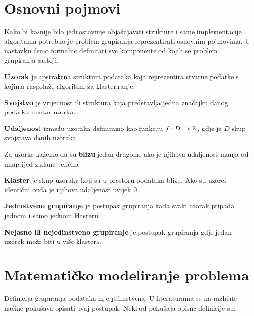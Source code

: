 \documentclass[a4paper,twoside,12pt]{memoir} %
\begin{document}
\section[Osnovni pojmovi][os-pojmovi]{Osnovni pojmovi}
Kako bi kasnije bilo jednostavnije objašnjavati strukture i same implementacije algoritama potrebno je problem grupiranja reprezentirati osnovnim pojmovima. U nastavku ćemo formalno definirati sve komponente od kojih se problem grupiranja sastoji.
\begin{defn}
\label{def:uzorak}
\textbf{Uzorak} je apstraktna struktura podataka koja reprezentira stvarne podatke s kojima raspolaže algoritam za klasteriranje.
\end{defn}
\begin{defn}
\label{def:svojstvo}
\textbf{Svojstvo} je vrijednost ili struktura koja predstavlja jednu značajku danog podatka unutar uzorka.
\end{defn}
\begin{defn}
\label{def:udaljenost}
\textbf{Udaljenost} između uzoraka definiramo kao funkciju 
$f: D  -> \mathbb{R}$, gdje je $D$ skup svojstava danih uzoraka
\end{defn}
\begin{defn}
\label{def:blizina}
Za uzorke kažemo da su \textbf{blizu} jedan drugome ako je njihova udaljenost manja od unaprijed zadane veličine
\end{defn}
\begin{defn}
\label{def:klaster}
\textbf{Klaster} je skup uzoraka koji su u prostoru podataka blizu. Ako su uzorci identični onda je njihova udaljenost uvijek $0$
\end{defn}
\begin{defn}
\label{def:hard}
\textbf{Jednistveno grupiranje} je postupak grupiranja kada svaki uzorak pripada jednom i samo jednom klasteru.
\end{defn}
\begin{defn}
\label{def:fuzzy}
\textbf{Nejasno ili nejedinstveno grupiranje} je postupak grupiranja gdje jedan uzorak može biti u više klastera.
\end{defn}


\section[Matematičko modeliranje problema][MMP]{Matematičko modeliranje problema}
Definicija grupiranja podataka nije jedinstvena. U literaturama se na različite načine pokušava opisati ovaj postupak. Neki od pokušaja opisne definicije su:
\end{document}
